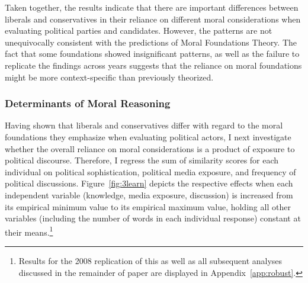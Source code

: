 \documentclass[12pt]{article}
\begin{document}
Taken together, the results indicate that there are important differences between liberals and conservatives in their reliance on different moral considerations when evaluating political parties and candidates. However, the patterns are not unequivocally consistent with the predictions of Moral Foundations Theory. The fact that some foundations showed insignificant patterns, as well as the failure to replicate the findings across years suggests that the reliance on moral foundations might be more context-specific than previously theorized.


\subsubsection{Determinants of Moral Reasoning}

Having shown that liberals and conservatives differ with regard to the moral foundations they emphasize when evaluating political actors, I next investigate whether the overall reliance on moral considerations is a product of exposure to political discourse. Therefore, I regress the sum of similarity scores for each individual on political sophistication, political media exposure, and frequency of political discussions. Figure~\ref{fig:3learn} depicts the respective effects when each independent variable (knowledge, media exposure, discussion) is increased from its empirical minimum value to its empirical maximum value, holding all other variables (including the number of words in each individual response) constant at their means.\footnote{Results for the 2008 replication of this as well as all subsequent analyses discussed in the remainder of paper are displayed in Appendix~\ref{app:robust}.}
\end{document}
